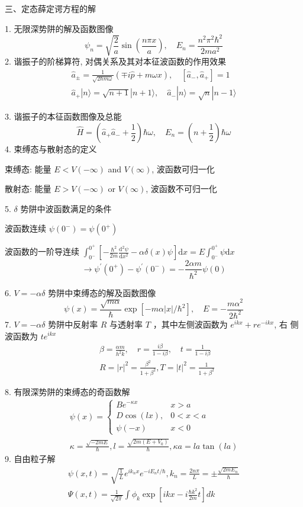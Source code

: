 \documentclass[../../note.tex]{subfiles}
\begin{document}
三、定态薛定谔方程的解

1. 无限深势阱的解及函数图像
$$
\psi_n=\sqrt{\frac{2}{a}} \sin \left(\frac{n \pi x}{a}\right), \quad E_n=\frac{n^2 \pi^2 \hbar^2}{2 m a^2}
$$
2. 谐振子的阶梯算符, 对偶关系及其对本征波函数的作用效果
$$
\begin{array}{r}
\hat{a}_{ \pm}=\frac{1}{\sqrt{2 \hbar m \omega}}(\mp i \hat{p}+m \omega x), \quad\left[\hat{a}_{-}, \hat{a}_{+}\right]=1 \\
\hat{a}_{+}|n\rangle=\sqrt{n+1}|n+1\rangle, \quad \hat{a}_{-}|n\rangle=\sqrt{n}|n-1\rangle
\end{array}
$$

3. 谐振子的本征函数图像及总能
$$
\hat{H}=\left(\hat{a}_{+} \hat{a}_{-}+\frac{1}{2}\right) \hbar \omega, \quad E_n=\left(n+\frac{1}{2}\right) \hbar \omega
$$
4. 束缚态与散射态的定义

束缚态: 能量 $E<V(-\infty)$ and $V(\infty)$, 波函数可归一化 

散射态: 能量 $E>V(-\infty)$ or $V(\infty)$, 波函数不可归一化

5. $\delta$ 势阱中波函数满足的条件

波函数连续 $\psi\left(0^{-}\right)=\psi\left(0^{+}\right)$

波函数的一阶导连续 $\int_{0^{-}}^{0^{+}}\left[-\frac{\hbar^2}{2 m} \frac{\mathrm{d}^2 \psi}{\mathrm{d} x^2}-\alpha \delta(x) \psi\right] \mathrm{d} x=E \int_{0^{-}}^{0^{+}} \psi \mathrm{d} x$
$$
\rightarrow \psi^{\prime}\left(0^{+}\right)-\psi^{\prime}\left(0^{-}\right)=-\frac{2 \alpha m}{\hbar^2} \psi(0)
$$

6. $V=-\alpha \delta$ 势阱中束缚态的解及函数图像
$$
\psi(x)=\frac{\sqrt{m \alpha}}{\hbar} \exp \left[-m \alpha|x| / \hbar^2\right], \quad E=-\frac{m \alpha^2}{2 \hbar^2}
$$
7. $V=-\alpha \delta$ 势阱中反射率 $R$ 与透射率 $T$ ，其中左侧波函数为 $e^{i k x}+r e^{-i k x}$, 右 侧波函数为 $t e^{i k x}$
$$
\begin{aligned}
& \beta=\frac{\alpha m}{h^2 k}, \quad r=\frac{i \beta}{1-i \beta}, \quad t=\frac{1}{1-i \beta} \\
& R=|r|^2=\frac{\beta^2}{1+\beta^2}, T=|t|^2=\frac{1}{1+\beta^2}
\end{aligned}
$$

8. 有限深势阱的束缚态的奇函数解
$$
\begin{gathered}
\psi(x)= \begin{cases}B e^{-\kappa x} & x>a \\
D \cos (l x), & 0<x<a \\
\psi(-x) & x<0\end{cases} \\
\kappa=\frac{\sqrt{-2 m E}}{\hbar}, l=\frac{\sqrt{2 m\left(E+V_0\right)}}{\hbar}, \kappa a=l a \tan (l a)
\end{gathered}
$$
9. 自由粒子解
$$
\begin{array}{r}
\psi(x, t)=\sqrt{\frac{1}{L}} e^{i k_n x} e^{-i E_n t / \hbar}, k_n=\frac{2 n \pi}{L}= \pm \frac{\sqrt{2 m E_n}}{\hbar} \\
\Psi(x, t)=\frac{1}{\sqrt{2 \pi}} \int \phi_k \exp \left[i k x-i \frac{\hbar k^2}{2 m} t\right] d k
\end{array}
$$
\end{document}
